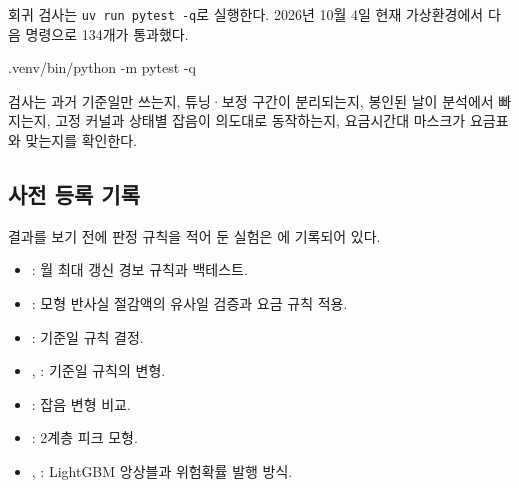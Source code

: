 회귀 검사는 \texttt{uv run pytest -q}로 실행한다. 2026년 10월 4일 현재 가상환경에서 다음 명령으로 134개가 통과했다.
\begin{flushleft}\ttfamily\small
.venv/bin/python -m pytest -q
\end{flushleft}
검사는 과거 기준일만 쓰는지, 튜닝·보정 구간이 분리되는지, 봉인된 날이 분석에서 빠지는지, 고정 커널과 상태별 잡음이 의도대로 동작하는지, 요금시간대 마스크가 요금표와 맞는지를 확인한다.

\subsection{사전 등록 기록}

결과를 보기 전에 판정 규칙을 적어 둔 실험은 에 기록되어 있다.
\begin{itemize}
\item {}: 월 최대 갱신 경보 규칙과 백테스트.
\item {}: 모형 반사실 절감액의 유사일 검증과 요금 규칙 적용.
\item {}: 기준일 규칙 결정.
\item {}, : 기준일 규칙의 변형.
\item {}: 잡음 변형 비교.
\item {}: 2계층 피크 모형.
\item {}, : LightGBM 앙상블과 위험확률 발행 방식.
\end{itemize}
